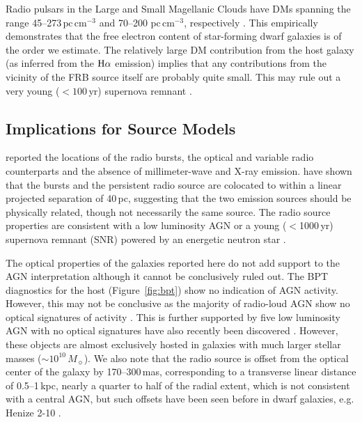 \documentclass[twocolumn]{aastex61}
\newcommand{\Halpha}{\rm H\alpha}
\begin{document}
Radio pulsars  in the Large and Small Magellanic Clouds have DMs spanning the range 45--273\,$\mathrm{pc\,cm^{-3}}$
 and  70--200 $\mathrm{pc\,cm^{-3}}$, respectively \citep{mhth05}. 
This empirically demonstrates that the free electron content of star-forming dwarf galaxies is of the order we estimate. The relatively large DM contribution from the host galaxy (as inferred from the $\Halpha$ emission) implies that any contributions from the vicinity of the FRB source itself are probably quite small. This may rule out a very young ($<100$\,yr) supernova remnant \citep[e.g. ][]{piro16}. 



\subsection{Implications for Source Models}
\citet{clw+16} reported the locations of the radio bursts, the optical and variable radio counterparts and the absence of millimeter-wave and X-ray emission. \citet{mph+16} have shown that the bursts and the persistent radio source are colocated to within a linear projected separation of 40\,pc, suggesting that the two emission sources should be physically related, though not necessarily the same source. The radio source properties are consistent with a low luminosity AGN or a young ($<$1000\,yr) supernova remnant (SNR) powered by an energetic neutron star \citep[e.g. ][]{mkm16}. 

The optical properties of the galaxies reported here do not add support to the AGN interpretation although it cannot be conclusively ruled out. The BPT diagnostics for the host (Figure~\ref{fig:bpt}) show no indication of AGN activity. However, this may not be conclusive as the majority of radio-loud AGN show no optical signatures of activity \citep{ms07}. This is further supported by five low luminosity AGN with no optical signatures have also recently been discovered \citep{pyop16}. However, these objects are almost exclusively hosted in galaxies with much larger stellar masses ($\sim10^{10}\,M_\sun$).
We also note that the radio source is offset from the optical center of the galaxy by 170--300\,mas, corresponding to a transverse linear distance of 0.5--1\,kpc, nearly a quarter to half of the radial extent, which is not consistent with a central AGN, but such offsets have been seen before in dwarf galaxies, e.g. Henize 2-10 \citep{rsjb11}. 
\end{document}
